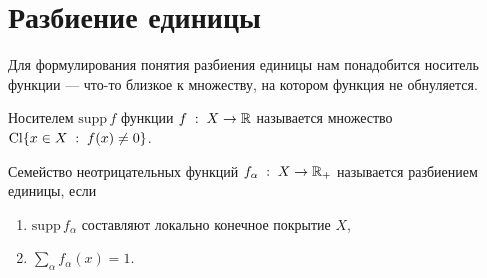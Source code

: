 \section{Разбиение единицы}
Для формулирования понятия разбиения единицы нам понадобится носитель функции --- что-то близкое к множеству, на котором функция не обнуляется.
\begin{Def}
    Носителем $\mathrm{supp}\,f$ функции $f\; : \; X \to \mathbb{R}$ называется множество $\mathrm{Cl} \{x\in X \; : \; f(x) \neq 0\}$.
\end{Def}

\begin{Def}
    Семейство неотрицательных функций $f_\alpha\; : \; X \to \mathbb{R}_+$ называется разбиением единицы, если
    \begin{enumerate}
        \item $\mathrm{supp}\, f_\alpha$ составляют локально конечное покрытие $X$,
        \item $\sum\limits_{\alpha} f_\alpha(x) = 1$.
    \end{enumerate}
\end{Def}
